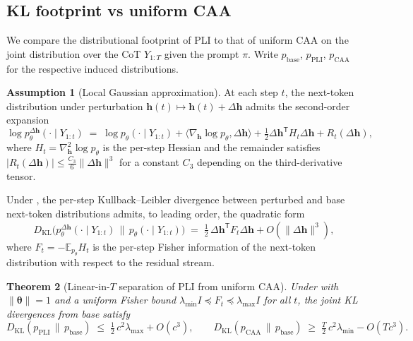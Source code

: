 \documentclass[11pt]{article}
\newtheorem{theorem}{Theorem}[section]
\theoremstyle{definition}
\newtheorem{assumption}[theorem]{Assumption}
\newcommand{\E}{\mathbb{E}}
\newcommand{\1}{\mathbf{1}}
\newcommand{\KL}{D_{\mathrm{KL}}}
\newcommand{\hh}{\bm{h}}
\newcommand{\thetab}{\bm{\theta}}
\newcommand{\T}{\mathsf{T}}
\begin{document}
\subsection{KL footprint vs uniform CAA}

We compare the distributional footprint of PLI to that of uniform CAA on the joint distribution over the CoT $Y_{1:T}$ given the prompt $\pi$. Write $p_{\mathrm{base}}$, $p_{\mathrm{PLI}}$, $p_{\mathrm{CAA}}$ for the respective induced distributions.

\begin{assumption}[Local Gaussian approximation]
\label{ass:gaussian}
At each step $t$, the next-token distribution under perturbation $\hh(t) \mapsto \hh(t) + \Delta\hh$ admits the second-order expansion
\[
\log p_{\theta}^{\Delta\hh}(\cdot \mid Y_{1:t}) \;=\; \log p_{\theta}(\cdot \mid Y_{1:t}) + \langle \nabla_{\hh} \log p_{\theta}, \Delta\hh \rangle + \tfrac{1}{2} \Delta\hh^{\T} H_t \Delta\hh + R_t(\Delta\hh),
\]
where $H_t = \nabla^2_{\hh} \log p_{\theta}$ is the per-step Hessian and the remainder satisfies $|R_t(\Delta\hh)| \le \tfrac{C_3}{6}\|\Delta\hh\|^3$ for a constant $C_3$ depending on the third-derivative tensor.
\end{assumption}

Under , the per-step Kullback--Leibler divergence between perturbed and base next-token distributions admits, to leading order, the quadratic form
\[
\KL\bigl(p_{\theta}^{\Delta\hh}(\cdot \mid Y_{1:t}) \,\big\|\, p_{\theta}(\cdot \mid Y_{1:t})\bigr) \;=\; \tfrac{1}{2}\, \Delta\hh^{\T} F_t \Delta\hh + O(\|\Delta\hh\|^3),
\]
where $F_t = -\E_{p_{\theta}} H_t$ is the per-step Fisher information of the next-token distribution with respect to the residual stream.

\begin{theorem}[Linear-in-$T$ separation of PLI from uniform CAA]
\label{thm:kl}
Under  with $\|\thetab\| = 1$ and a uniform Fisher bound $\lambda_{\min} I \preceq F_t \preceq \lambda_{\max} I$ for all $t$, the joint KL divergences from base satisfy
\[
\KL(p_{\mathrm{PLI}} \,\|\, p_{\mathrm{base}}) \;\le\; \tfrac{1}{2}\, c^2 \lambda_{\max} + O(c^3),
\qquad
\KL(p_{\mathrm{CAA}} \,\|\, p_{\mathrm{base}}) \;\ge\; \tfrac{T}{2}\, c^2 \lambda_{\min} - O(T c^3).
\]
\end{theorem}
\end{document}
